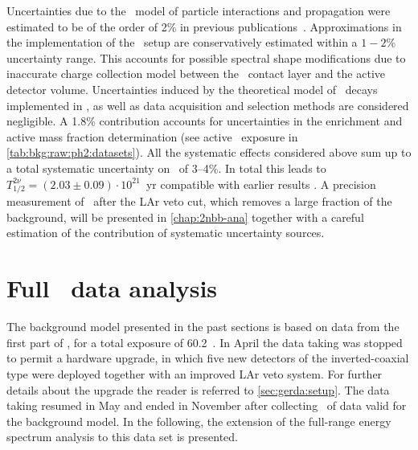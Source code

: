 Uncertainties due to the \geant\ model of particle interactions and propagation were
estimated to be of the order of 2\% in previous publications~\cite{Agostini2013a,
Agostini2015a}. Approximations in the implementation of the \gerda\ setup are
conservatively estimated within a $1-2$\% uncertainty range. This accounts for possible
spectral shape modifications due to inaccurate charge collection model between the \nplus\
contact layer and the active detector volume. Uncertainties induced by the theoretical
model of \nnbb\ decays implemented in \decayzero, as well as data acquisition and
selection methods are considered negligible. A 1.8\% contribution accounts for
uncertainties in the enrichment and active mass fraction determination (see active \gesix\
exposure in \cref{tab:bkg:raw:ph2:datasets}). All the systematic effects considered above
sum up to a total systematic uncertainty on \thalftwo\ of 3--4\%. In total this leads to
$T^{2\nu}_{1/2} = (2.03 \pm 0.09) \cdot 10^{21}$~yr compatible with earlier results
\cite{Agostini2013a, Agostini2015a}. A precision measurement of \thalftwo\ after the LAr
veto cut, which removes a large fraction of the background, will be presented in
\cref{chap:2nbb-ana} together with a careful estimation of the contribution of systematic
uncertainty sources.

\section{Full \phasetwo\ data analysis}%
\label{sec:bkg:raw:ph2p}

The background model presented in the past sections is based on data from the first part
of \phasetwo, for a total exposure of 60.2~\kgyr. In April  the data taking was
stopped to permit a hardware upgrade, in which five new detectors of the inverted-coaxial
type were deployed together with an improved LAr veto system. For further details about
the upgrade the reader is referred to \cref{sec:gerda:setup}. The data taking resumed in
May \yr{2018} and ended in November \yr{2019} after collecting \gexpophasetwopbkg\ of data
valid for the background model. In the following, the extension of the full-range energy
spectrum analysis to this data set is presented.

